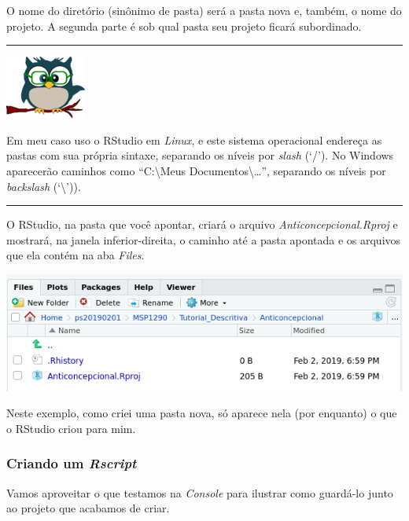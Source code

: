 \documentclass[
]{article}
\begin{document}
O nome do diretório (sinônimo de pasta) será a pasta nova e, também, o
nome do projeto. A segunda parte é sob qual pasta seu projeto ficará
subordinado.

\begin{center}\rule{0.5\linewidth}{0.5pt}\end{center}

\begin{flushleft}\includegraphics[width=0.08\linewidth]{coruja} \end{flushleft}

Em meu caso uso o RStudio em \emph{Linux}, e este sistema operacional
endereça as pastas com sua própria sintaxe, separando os níveis por
\emph{slash} (`/'). No Windows aparecerão caminhos como
``C:\textbackslash Meus Documentos\textbackslash\ldots{}'', separando os
níveis por \emph{backslash} (`\textbackslash{}')).

\begin{center}\rule{0.5\linewidth}{0.5pt}\end{center}

O RStudio, na pasta que você apontar, criará o arquivo
\emph{Anticoncepcional.Rproj} e mostrará, na janela inferior-direita, o
caminho até a pasta apontada e os arquivos que ela contém na aba
\emph{Files}.

\begin{center}\includegraphics[width=0.9\linewidth]{RStudio_files} \end{center}

Neste exemplo, como criei uma pasta nova, só aparece nela (por enquanto)
o que o RStudio criou para mim.

\hypertarget{criando-um-rscript}{%
\subsubsection{\texorpdfstring{Criando um
\emph{Rscript}}{Criando um Rscript}}\label{criando-um-rscript}}

Vamos aproveitar o que testamos na \emph{Console} para ilustrar como
guardá-lo junto ao projeto que acabamos de criar.
\end{document}
